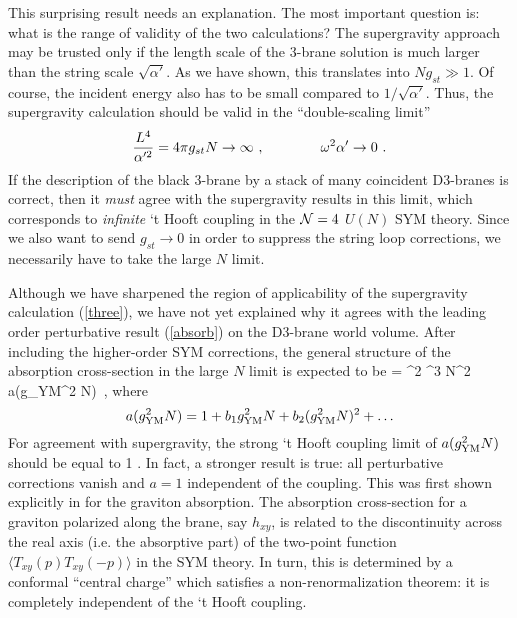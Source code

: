 This surprising result needs an
explanation. The most important question is: what is the range of
validity of the two calculations? 
The supergravity approach may be trusted only if
the length scale of the 3-brane solution is much larger than the 
string scale $\sqrt{\alpha'}$. As we have shown, this translates into
$N g_{st} \gg 1$.
Of course, the incident energy also has
to be small compared to $1/\sqrt{\alpha'}$. 
Thus, the supergravity calculation should
be valid in the ``double-scaling limit'' \cite{kleb}
\begin{equation}
\label{dsl}
{L^4\over \alpha'^2} = 4\pi  g_{st} N \rightarrow \infty\ ,
\qquad\qquad \omega^2 \alpha' \rightarrow 0\ .
\end{equation}
If the description of the black 3-brane by a stack of
many coincident D3-branes is correct, 
then it {\it must} agree with the supergravity results in this limit,
which corresponds to {\it infinite} `t Hooft coupling in the  
${\cal N}=4$ $U(N)$ SYM theory. Since we also want to send $g_{st}
\rightarrow 0$ in order to suppress the string loop corrections,
we necessarily have to take the large $N$ limit.

Although we have sharpened the region of applicability of the
supergravity calculation (\ref{three}), we have not yet explained why
it agrees with the leading order perturbative result (\ref{absorb})
on the D3-brane world volume. 
After including the higher-order SYM corrections, the general structure
of the absorption cross-section in the large $N$ limit
is expected to be \cite{gkThree}
\be\label{newabsorb}
   \sigma = {\kappa^2  \omega^3 N^2 \pi} a(g_{\rm YM}^2 N)\ ,
 \ee
where
$$ a(g_{\rm YM}^2 N) = 1 + b_1 g_{\rm YM}^2 N + 
b_2 (g_{\rm YM}^2 N)^2 + \ldots
$$
For agreement with supergravity, the strong
`t Hooft coupling limit of $a(g_{\rm YM}^2 N)$ should be equal to 1 
\cite{gkThree}. In fact, a stronger result is true: all perturbative
corrections vanish and $a=1$ independent of the coupling.
This was first shown explicitly in \cite{gkThree} for the graviton
absorption. The absorption cross-section for a graviton polarized along
the brane, say $h_{xy}$, is related to the discontinuity across the
real axis (i.e. the absorptive part) of the two-point function
$\langle T_{xy} (p) T_{xy} (-p) \rangle$
in the SYM theory. In turn,
this is determined by a conformal ``central charge''
which satisfies a non-renormalization theorem: it is completely
independent of the `t Hooft coupling.

